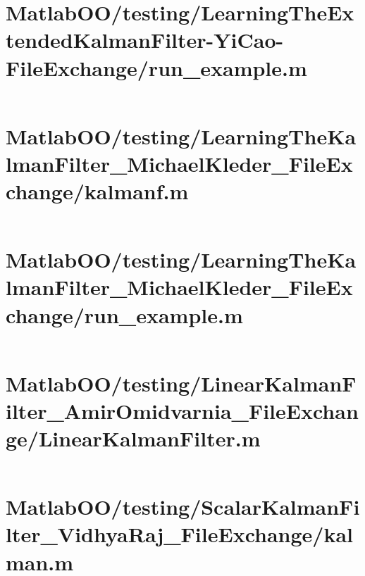 \pagebreak
\section{MatlabOO/testing/LearningTheExtendedKalmanFilter-YiCao-FileExchange/run\_example.m}\label{code:MatlabOO/testing/LearningTheExtendedKalmanFilter-YiCao-FileExchange/run_example.m}
\inputminted[linenos,fontsize=\scriptsize]{matlab}{/home/dcouture/git/mathyourlife/TSatPy/beta_versions/matlab_object_oriented/testing/LearningTheExtendedKalmanFilter-YiCao-FileExchange/run_example.m}

\pagebreak
\section{MatlabOO/testing/LearningTheKalmanFilter\_MichaelKleder\_FileExchange/kalmanf.m}\label{code:MatlabOO/testing/LearningTheKalmanFilter_MichaelKleder_FileExchange/kalmanf.m}
\inputminted[linenos,fontsize=\scriptsize]{matlab}{/home/dcouture/git/mathyourlife/TSatPy/beta_versions/matlab_object_oriented/testing/LearningTheKalmanFilter_MichaelKleder_FileExchange/kalmanf.m}

\pagebreak
\section{MatlabOO/testing/LearningTheKalmanFilter\_MichaelKleder\_FileExchange/run\_example.m}\label{code:MatlabOO/testing/LearningTheKalmanFilter_MichaelKleder_FileExchange/run_example.m}
\inputminted[linenos,fontsize=\scriptsize]{matlab}{/home/dcouture/git/mathyourlife/TSatPy/beta_versions/matlab_object_oriented/testing/LearningTheKalmanFilter_MichaelKleder_FileExchange/run_example.m}

\pagebreak
\section{MatlabOO/testing/LinearKalmanFilter\_AmirOmidvarnia\_FileExchange/LinearKalmanFilter.m}\label{code:MatlabOO/testing/LinearKalmanFilter_AmirOmidvarnia_FileExchange/LinearKalmanFilter.m}
\inputminted[linenos,fontsize=\scriptsize]{matlab}{/home/dcouture/git/mathyourlife/TSatPy/beta_versions/matlab_object_oriented/testing/LinearKalmanFilter_AmirOmidvarnia_FileExchange/LinearKalmanFilter.m}

\pagebreak
\section{MatlabOO/testing/ScalarKalmanFilter\_VidhyaRaj\_FileExchange/kalman.m}\label{code:MatlabOO/testing/ScalarKalmanFilter_VidhyaRaj_FileExchange/kalman.m}
\inputminted[linenos,fontsize=\scriptsize]{matlab}{/home/dcouture/git/mathyourlife/TSatPy/beta_versions/matlab_object_oriented/testing/ScalarKalmanFilter_VidhyaRaj_FileExchange/kalman.m}

